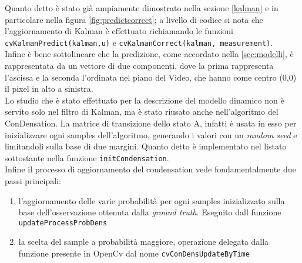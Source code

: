 Quanto detto è stato già ampiamente dimostrato nella sezione \ref{kalman} e in particolare nella figura \ref{fig:predictcorrect}; a livello di codice si nota che l'aggiornamento di Kalman è effettuato richiamando le funzioni \texttt{cvKalmanPredict(kalman,u)} e  \texttt{cvKalmanCorrect(kalman, measurement)}.\\
Infine è bene sottolineare che la predizione, come accordato nella \ref{sec:modelli}, è rappresentata da un vettore di due componenti, dove la prima rappresenta l'ascissa e la seconda l'ordinata nel piano del Video, che hanno come centro (0,0) il pixel in alto a sinistra.\\
\newpage
Lo studio che è stato effettuato per la descrizione del modello dinamico non è servito solo nel filtro di Kalman, ma è stato riusato anche nell'algoritmo del ConDensation. La matrice di transizione dello stato A, infatti è usata in esso per inizializzare ogni samples dell'algoritmo, generando i valori con un \textit{random seed} e limitandoli sulla base di due margini. Quanto detto è implementato nel listato sottostante nella funzione \texttt{initCondensation}.\\
Infine il processo di aggiornamento del condensation vede fondamentalmente due passi principali:
\begin{enumerate}
 \item l'aggiornamento delle varie probabilità per ogni samples inizializzato sulla base dell'osservazione ottenuta dalla \textit{ground truth}. Eseguito dall funzione \texttt{updateProcessProbDens}
\item  la scelta del sample a probabilità maggiore, operazione delegata dalla funzione presente in OpenCv dal nome \texttt{cvConDensUpdateByTime}
\end{enumerate}




